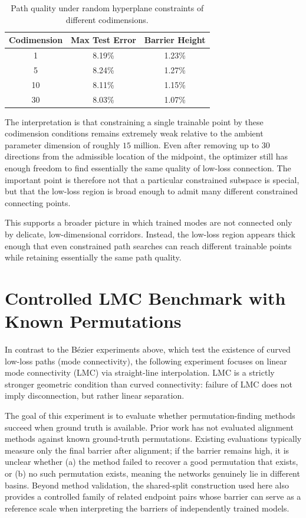 \documentclass[11pt,a4paper]{report}
\begin{document}
\begin{table}[H]
    \centering
    \label{tab:random_plane_codim_results}
    \begin{tabular}{ccc}
        \toprule
        \textbf{Codimension} & \textbf{Max Test Error} & \textbf{Barrier Height} \\
        \midrule
        1 & 8.19\% & 1.23\% \\
        5 & 8.24\% & 1.27\% \\
        10 & 8.11\% & 1.15\% \\
        30 & 8.03\% & 1.07\% \\
        \bottomrule
    \end{tabular}
    \caption{Path quality under random hyperplane constraints of different codimensions.}
\end{table}

The interpretation is that constraining a single trainable point by these codimension conditions remains extremely weak relative to the ambient parameter dimension of roughly $15$ million. Even after removing up to $30$ directions from the admissible location of the midpoint, the optimizer still has enough freedom to find essentially the same quality of low-loss connection. The important point is therefore not that a particular constrained subspace is special, but that the low-loss region is broad enough to admit many different constrained connecting points.

This supports a broader picture in which trained modes are not connected only by delicate, low-dimensional corridors. Instead, the low-loss region appears thick enough that even constrained path searches can reach different trainable points while retaining essentially the same path quality.

\section{Controlled LMC Benchmark with Known Permutations}
\label{sec:controlled_benchmark}

In contrast to the Bézier experiments above, which test the existence of curved low-loss paths (mode connectivity), the following experiment focuses on linear mode connectivity (LMC) via straight-line interpolation. LMC is a strictly stronger geometric condition than curved connectivity: failure of LMC does not imply disconnection, but rather linear separation.

The goal of this experiment is to evaluate whether permutation-finding methods succeed when ground truth is available. Prior work has not evaluated alignment methods against known ground-truth permutations. Existing evaluations typically measure only the final barrier after alignment; if the barrier remains high, it is unclear whether (a) the method failed to recover a good permutation that exists, or (b) no such permutation exists, meaning the networks genuinely lie in different basins. Beyond method validation, the shared-split construction used here also provides a controlled family of related endpoint pairs whose barrier can serve as a reference scale when interpreting the barriers of independently trained models.
\end{document}
